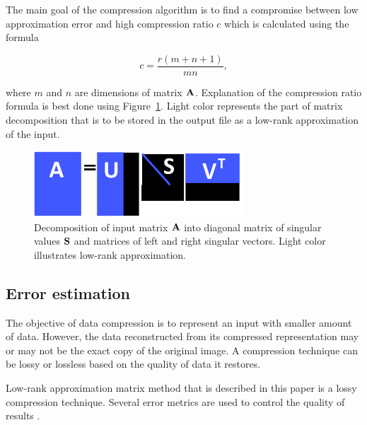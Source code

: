 The main goal of the compression algorithm is to find a compromise between low approximation error and high compression ratio $c$ which is calculated using the formula

\begin{equation}
c=\frac{r(m+n+1)}{m n},
\label{eq:cr-def}
\end{equation}

\noindent
where $m$ and $n$ are dimensions of matrix $\mathbf{A}$. Explanation of the compression ratio formula is best done using Figure~\ref{fig:lowrank_svd}. Light color represents the part of matrix decomposition that is to be stored in the output file as a low-rank approximation of the input.

\begin{figure}[H]
\centering\includegraphics[width=0.7\textwidth]{figures/low_rank_decomposition_diagram}
\caption{Decomposition of input matrix $\mathbf{A}$ into diagonal matrix of singular values $\mathbf{S}$ and matrices of left and right singular vectors. Light color illustrates low-rank approximation.}
\label{fig:lowrank_svd}
\end{figure}

\subsection{Error estimation}
\label{sec:error}

The objective of data compression is to represent an input with smaller amount of data. However, the data reconstructed from its compressed representation may or may not be the exact copy of the original image. A compression technique can be lossy or lossless based on the quality of data it restores.

Low-rank approximation matrix method that is described in this paper is a lossy compression technique. Several error metrics are used to control the quality of results \cite{SairaBanu2015}.

